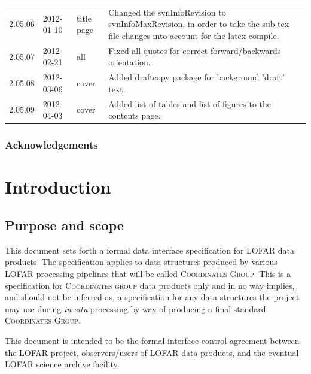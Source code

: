 \documentclass[a4paper,10pt,bibtotoc]{scrreprt}
\begin{document}
\begin{center}
\begin{supertabular}{lllp{10cm}}
    2.05.06 & 2012-01-10 & title page &  Changed the svnInfoRevision to svnInfoMaxRevision, in order to take the sub-tex file changes into account for the latex compile. \\
    2.05.07 & 2012-02-21 & all & Fixed all quotes for correct forward/backwards orientation. \\
    2.05.08 & 2012-03-06 & cover   & Added draftcopy package for background 'draft' text.\\
    2.05.09 & 2012-04-03 & cover  & Added list of tables and list of figures to the contents page. \\

 \end{supertabular}
\end{center}





\subsection*{Acknowledgements}

\clearpage


\chapter{Introduction}
\label{sec:introduction}

\section{Purpose and scope}
\label{sec:purpose and scope}

This document sets forth a formal data interface specification for LOFAR data
products. The specification applies to data structures produced by various LOFAR
processing pipelines that will be called \textsc{Coordinates Group}. This is a
specification for \textsc{Coordinates group} data products only and in no way
implies, and should not be inferred as, a specification for any data structures
the project may use during \textit{in situ} processing by way of producing a final
standard \textsc{Coordinates Group}.

This document is intended to be the formal interface control agreement between
the LOFAR project, observers/users of LOFAR data products, and the eventual LOFAR
science archive facility.
\end{document}

